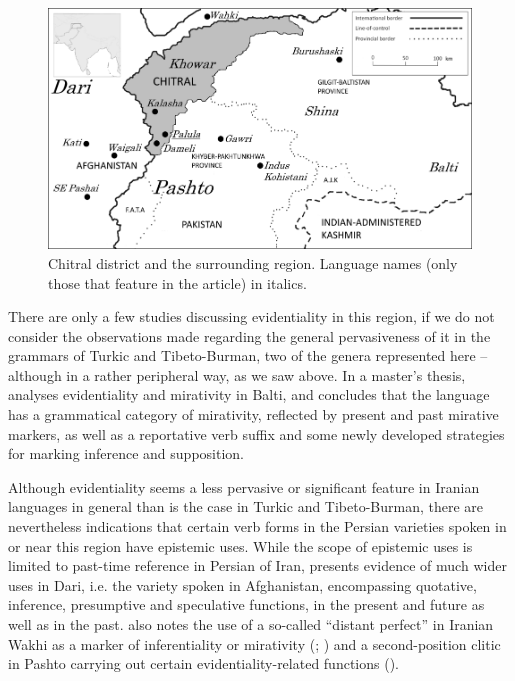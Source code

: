 \documentclass[output=paper]{langsci/langscibook}
\begin{document}
\begin{figure}
\centering
  \includegraphics[width=\linewidth]{figures/liljegren-1}
  \caption{Chitral district and the surrounding region. Language names (only those that feature in the article) in italics.}
  \label{fig:hl1}
\end{figure}


There are only a few studies discussing evidentiality in this region, if we do not consider the observations made regarding the general pervasiveness of it in the grammars of Turkic and Tibeto-Burman, two of the genera represented here – although in a rather peripheral way, as we saw above. In a master’s thesis, \cite{Jones2009a} analyses evidentiality and mirativity in Balti, and concludes that the language has a grammatical category of mirativity, reflected by present and past mirative markers, as well as a reportative verb suffix and some newly developed strategies for marking inference and supposition. 

Although evidentiality seems a less pervasive or significant feature in Iranian languages in general than is the case in Turkic and Tibeto-Burman, there are nevertheless indications that certain verb forms in the Persian varieties spoken in or near this region have epistemic uses. While the scope of epistemic uses is limited to past-time reference in Persian of Iran, \cite{Perry2000} presents evidence of much wider uses in Dari, i.e. the variety spoken in Afghanistan, encompassing quotative, inference, presumptive and speculative functions, in the present and future as well as in the past. \citeauthor{Bashir2006} also notes the use of a so-called “distant perfect” in Iranian Wakhi as a marker of inferentiality or mirativity (\citeyear{Bashir2006}; \citeyear[840]{Bashir2009}) and a second-position clitic in Pashto carrying out certain evidentiality-related functions (\citeyear{Bashir2006}).
\end{document}
